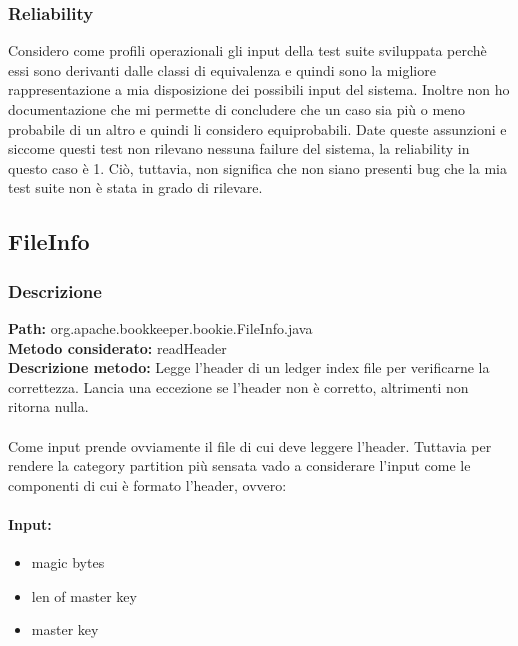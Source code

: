 \documentclass[10pt, a4paper]{article}
\begin{document}
\subsubsection{Reliability}
Considero come profili operazionali gli input della test suite sviluppata perchè essi sono derivanti dalle classi di equivalenza
e quindi sono la migliore rappresentazione a mia disposizione dei possibili input del sistema. Inoltre non ho documentazione che
mi permette di concludere che un caso sia più o meno probabile di un altro e quindi li considero equiprobabili. Date queste 
assunzioni e siccome questi test non rilevano nessuna failure del sistema, la reliability in questo caso è 1. Ciò, tuttavia,
 non significa che non siano presenti bug che la mia test suite non è stata in grado di rilevare.

\subsection{FileInfo}
\subsubsection{Descrizione}
\textbf{Path:} org.apache.bookkeeper.bookie.FileInfo.java \\
\textbf{Metodo considerato:} readHeader \\ 
\textbf{Descrizione metodo:} Legge l'header di un ledger index file per verificarne la correttezza.
Lancia una eccezione se l'header non è corretto, altrimenti non ritorna nulla.\\ \\
Come input prende ovviamente il file di cui deve leggere l'header. Tuttavia per rendere la category partition più sensata
vado a considerare l'input come le componenti di cui è formato l'header, ovvero:
\paragraph{Input:}
\begin{itemize}
  \item magic bytes
  \item len of master key
  \item master key
\end{itemize}
\end{document}
